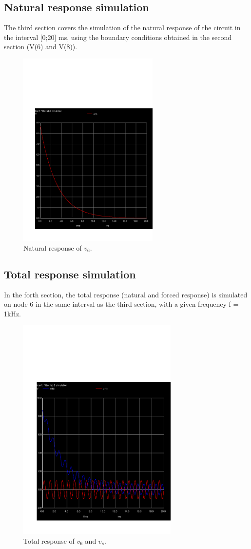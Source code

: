 \subsection{Natural response simulation}
The third section covers the simulation of the natural response of the circuit in the interval [0;20] ms, using the boundary conditions obtained in the second section (V(6) and V(8)).
\begin{figure}[h!] \centering
\includegraphics[width=7cm]{../sim/trans.pdf}
\caption{Natural response of $v_6$.}
\label{fig:trans}
\end{figure}

\subsection{Total response simulation}
In the forth section, the total response (natural and forced response) is simulated on node 6 in the same interval as the third section, with a given frequency f = 1kHz.
\begin{figure}[h!] \centering
\includegraphics[width=8cm]{../sim/trans2.pdf}
\caption{Total response of $v_6$ and $v_s$.}
\label{fig:trans2}
\end{figure}
\newpage
